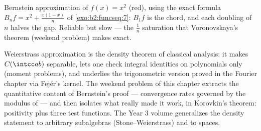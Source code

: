 \begin{omfigure}

{\small Bernstein approximation of $f(x) = x^2$ (red), using
the exact formula $B_nf = x^2 + \frac{x(1-x)}{n}$ of
\cref{exo:b2:funcseq:7}: $B_1f$ is the chord, and each doubling
of $n$ halves the gap. Reliable but slow --- the $\frac1n$
saturation that Voronovskaya's theorem (weekend problem) makes
exact.}
\end{omfigure}

\begin{remark}
Weierstrass approximation is the density theorem of classical
analysis: it makes $C(\intcc ab)$ separable, lets one check
integral identities on polynomials only (moment problems), and
underlies the trigonometric version proved in the Fourier
chapter via Fej\'er's kernel. The weekend problem of this
chapter extracts the quantitative content of Bernstein's proof
--- convergence rates governed by the modulus of  ---
and then isolates what really made it work, in Korovkin's
theorem: positivity plus three test functions. The Year 3
volume generalizes the density statement to arbitrary
subalgebras (Stone--Weierstrass) and to  spaces.
\end{remark}

